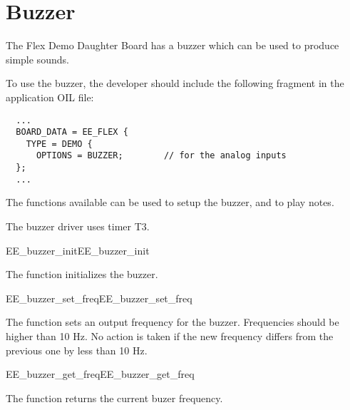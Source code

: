 \section{Buzzer}

The Flex Demo Daughter Board has a buzzer which can be used to produce
simple sounds.

To use the buzzer, the developer should
include the following fragment in the application OIL file:

\begin{lstlisting}
  ...
  BOARD_DATA = EE_FLEX {
    TYPE = DEMO {
      OPTIONS = BUZZER;        // for the analog inputs 
  };
  ...
\end{lstlisting}

The functions available can be used to setup the buzzer, and to play notes.

\begin{warning}
The buzzer driver uses timer T3.
\end{warning}

\begin{function_nopb2}{EE\_buzzer\_init}{EE_buzzer_init}
  
  \begin{fundescription}
    The function initializes the buzzer.
  \end{fundescription}
\end{function_nopb2}

\begin{function_nopb2}{EE\_buzzer\_set\_freq}{EE_buzzer_set_freq}
  
  \begin{fundescription}
    The function sets an output frequency for the buzzer. Frequencies
    should be higher than 10 Hz. No action is taken if the new
    frequency differs from the previous one by less than 10 Hz.
  \end{fundescription}
  
\begin{funparameters}
\end{funparameters}
\end{function_nopb2}

\begin{function_nopb2}{EE\_buzzer\_get\_freq}{EE_buzzer_get_freq}
  
  \begin{fundescription}
    The function returns the current buzer frequency.
  \end{fundescription}
  
\begin{funreturn}
\end{funreturn}
\end{function_nopb2}


